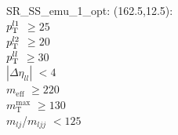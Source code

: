 SR\_SS\_emu\_1\_opt: (162.5,12.5): \\
$p_{\text{T}}^{l1}$ $\geq 25$ \\
$p_{\text{T}}^{l2}$ $\geq 20$ \\
$p_{\text{T}}^{ll}$ $\geq 30$ \\
$|\Delta\eta_{ll}|$ $<4$ \\
$m_{\text{eff}}$ $\geq 220$ \\
$m_{\text{T}}^{\text{max}}$ $\geq 130$ \\
$m_{lj}$/$m_{ljj}$ $<125$ \\
